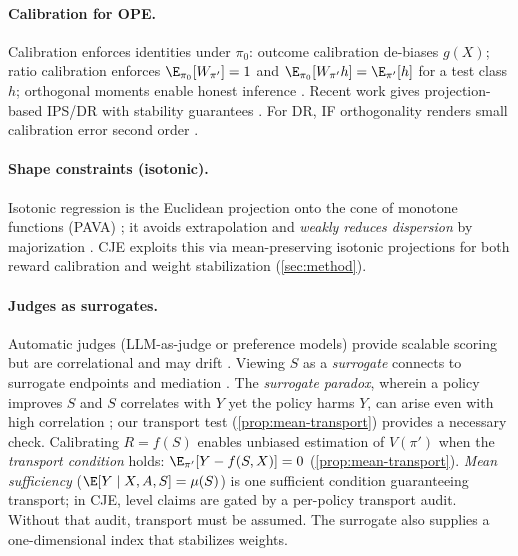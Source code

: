 \paragraph{Calibration for OPE.}
Calibration enforces identities under $\pi_{0}$: outcome calibration de-biases $g(X)$; ratio calibration
enforces $\E_{\pi_{0}}[W_{\pi'}]=1$ and $\E_{\pi_{0}}[W_{\pi'}h]=\E_{\pi'}[h]$ for a test class $h$;
orthogonal moments enable honest inference \citep{Chernozhukov2018}. Recent work gives
projection-based IPS/DR with stability guarantees
\citep{vanDerLaanLinCaroneLuedtke2025StabIPW,vanDerLaanLuedtkeCarone2024DRCalibration}. For DR, IF
orthogonality renders small calibration error second order
\citep{Bickel1993,Chernozhukov2018,vanDerLaanRose2011TL}.

\paragraph{Shape constraints (isotonic).}
Isotonic regression is the Euclidean projection onto the cone of monotone functions (PAVA)
\citep{Ayer1955PAVA,Barlow1972}; it avoids extrapolation and \emph{weakly reduces dispersion} by
majorization \citep{HardyLittlewoodPolya1952,MarshallOlkinArnold2011}. CJE exploits this via mean-preserving isotonic projections for both reward calibration and weight stabilization (\cref{sec:method}).

\paragraph{Judges as surrogates.}
Automatic judges (LLM-as-judge or preference models) provide scalable scoring
\citep{Ouyang2022Instruct,BaiEtAl2022,Zheng2023LLMasJudge,Kim2024PrometheusJudge,KocmiFedermann2023}
but are correlational and may drift \citep{DietzEtAl2025LLMJudges}. Viewing $S$
as a \emph{surrogate} connects to surrogate endpoints and mediation
\citep{Prentice1989Surrogate,RobinsGreenland1992,FrangakisRubin2002PS,Pearl2012Mediation,VanderWeele2015Book}.
The \emph{surrogate paradox}, wherein a policy improves $S$ and $S$ correlates with $Y$ yet the policy harms $Y$, can arise even with high correlation \citep{VanderWeele2013Surrogates}; our transport test (\cref{prop:mean-transport}) provides a necessary check.
Calibrating $R=f(S)$ enables unbiased estimation of $V(\pi')$ when the \emph{transport condition} holds: $\E_{\pi'}[Y - f(S,X)] = 0$ (\cref{prop:mean-transport}). \emph{Mean sufficiency} ($\E[Y\mid X,A,S]=\mu(S)$) is one sufficient condition guaranteeing transport; in CJE, level claims are gated by a per-policy transport audit. Without that audit, transport must be assumed. The surrogate also supplies a one-dimensional index that stabilizes weights.

